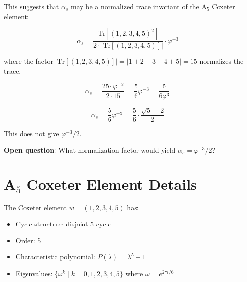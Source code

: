\documentclass{article}
\begin{document}
This suggests that $\alpha_s$ may be a normalized trace invariant of the A$_5$ Coxeter element:

\[
\alpha_s = \frac{\text{Tr}[(1,2,3,4,5)^2]}{2 \cdot |\text{Tr}[(1,2,3,4,5)]|} \cdot \varphi^{-3}
\]

where the factor $|\text{Tr}[(1,2,3,4,5)]| = |1+2+3+4+5| = 15$ normalizes the trace.

\[
\alpha_s = \frac{25 \cdot \varphi^{-3}}{2 \cdot 15} = \frac{5}{6}\varphi^{-3} = \frac{5}{6\varphi^3}
\]

\[
\alpha_s = \frac{5}{6} \varphi^{-3} = \frac{5}{6} \cdot \frac{\sqrt{5} - 2}{2}
\]

This does not give $\varphi^{-3}/2$.

\textbf{Open question:} What normalization factor would yield $\alpha_s = \varphi^{-3}/2$?

\appendix

\section{A$_5$ Coxeter Element Details}

The Coxeter element $w = (1,2,3,4,5)$ has:

\begin{itemize}
\item Cycle structure: disjoint 5-cycle
\item Order: 5
\item Characteristic polynomial: $P(\lambda) = \lambda^5 - 1$
\item Eigenvalues: $\{\omega^k \mid k = 0, 1, 2, 3, 4, 5\}$ where $\omega = e^{2\pi i/6}$
\end{itemize}
\end{document}
